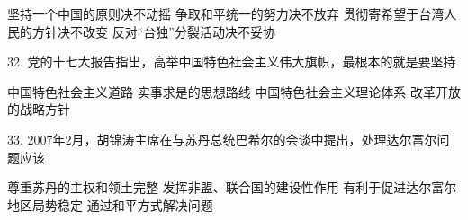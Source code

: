 \begin{choices}
	 坚持一个中国的原则决不动摇
	 争取和平统一的努力决不放弃
	 贯彻寄希望于台湾人民的方针决不改变
	 反对“台独”分裂活动决不妥协
\end{choices}
32. 党的十七大报告指出，高举中国特色社会主义伟大旗帜，最根本的就是要坚持
\begin{choices}
	 中国特色社会主义道路
	 实事求是的思想路线
	 中国特色社会主义理论体系
	 改革开放的战略方针
\end{choices}
33. 2007年2月，胡锦涛主席在与苏丹总统巴希尔的会谈中提出，处理达尔富尔问题应该
\begin{choices}
	 尊重苏丹的主权和领土完整
	 发挥非盟、联合国的建设性作用
	 有利于促进达尔富尔地区局势稳定
	 通过和平方式解决问题
\end{choices}
\vspace{6pt}
